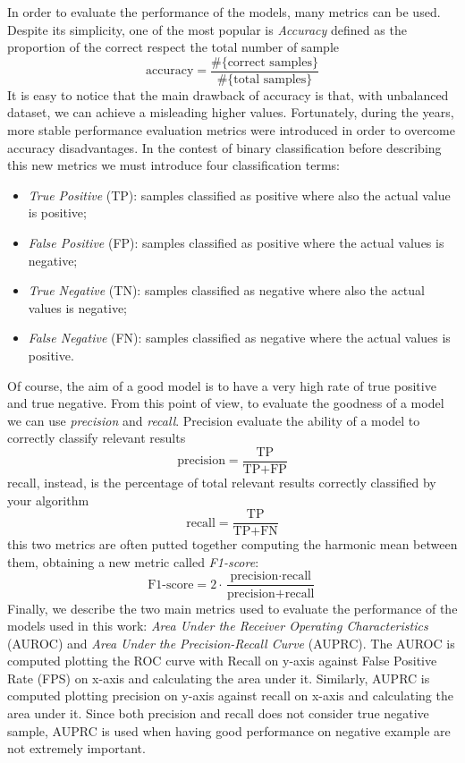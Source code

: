 In order to evaluate the performance of the models, many metrics can be used. Despite its simplicity, one of the most popular is \emph{Accuracy} defined as the proportion of the correct respect the total number of sample
\begin{equation}
    \textrm{accuracy} = \frac{\#\{\textrm{correct samples}\}}{\#\{\textrm{total samples}\}}
\end{equation}
It is easy to notice that the main drawback of accuracy is that, with unbalanced dataset, we can achieve a misleading higher values. Fortunately, during the years, more stable performance evaluation metrics were introduced in order to overcome accuracy disadvantages. In the contest of binary classification before describing this new metrics we must introduce four classification terms: 
\begin{itemize}
\item \emph{True Positive} (TP): samples classified as positive where also the actual value is positive;
\item \emph{False Positive} (FP): samples classified as positive where the actual values is negative;
\item \emph{True Negative} (TN): samples classified as negative where also the actual values is negative;
\item \emph{False Negative} (FN): samples classified as negative where the actual values is positive.
\end{itemize}
Of course, the aim of a good model is to have a very high rate of true positive and true negative. From this point of view, to evaluate the goodness of a model we can use \emph{precision} and \emph{recall}. Precision evaluate the ability of a model to correctly classify relevant results
\begin{equation}
    \textrm{precision} = \frac{\textrm{TP}}{\textrm{TP}+\textrm{FP}}
\end{equation}
recall, instead, is the percentage of total relevant results correctly classified by your algorithm 
\begin{equation}
    \textrm{recall} = \frac{\textrm{TP}}{\textrm{TP}+\textrm{FN}}
\end{equation}
this two metrics are often putted together computing the harmonic mean between them, obtaining a new metric called \emph{F1-score}:
\begin{equation}
    \textrm{F1-score} = 2 \cdot \frac{\textrm{precision} \cdot \textrm{recall}}{\textrm{precision}+\textrm{recall}}
\end{equation}
Finally, we describe the two main metrics used to evaluate the performance of the models used in this work: \emph{Area Under the Receiver Operating Characteristics} (AUROC) and \emph{Area Under the Precision-Recall Curve} (AUPRC). 
The AUROC is computed plotting the ROC curve with Recall on y-axis against False Positive Rate (FPS) on x-axis and calculating the area under it.  Similarly, AUPRC is computed plotting precision on y-axis against recall on x-axis and calculating the area under it. Since both precision and recall does not consider true negative sample, AUPRC is used when having good performance on negative example are not extremely important. 